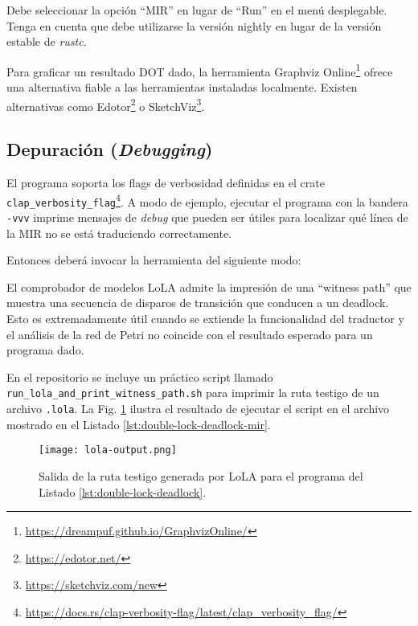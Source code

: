 Debe seleccionar la opción ``MIR'' en lugar de ``Run'' en el menú desplegable.
Tenga en cuenta que debe utilizarse la versión nightly en lugar de la versión estable de \emph{rustc}.

Para graficar un resultado DOT dado,
la herramienta Graphviz Online\footnote{\url{https://dreampuf.github.io/GraphvizOnline/}}
ofrece una alternativa fiable a las herramientas instaladas localmente.
Existen alternativas como Edotor\footnote{\url{https://edotor.net/}}
o SketchViz\footnote{\url{https://sketchviz.com/new}}.

\subsection{Depuración (\textit{Debugging})}
\label{sec:debugging}

El programa soporta los flags de verbosidad definidas en el crate
\texttt{clap\_verbosity\_flag}\footnote{\url{https://docs.rs/clap-verbosity-flag/latest/clap\_verbosity\_flag/}}.
A modo de ejemplo, ejecutar el programa con la bandera \texttt{-vvv} imprime mensajes de \emph{debug} que
pueden ser útiles para localizar qué línea de la \acrshort{MIR} no se está traduciendo correctamente.

Entonces deberá invocar la herramienta del siguiente modo:


El comprobador de modelos \acrshort{LoLA} admite la impresión de una ``witness path''
que muestra una secuencia de disparos de transición que conducen a un deadlock.
Esto es extremadamente útil cuando se extiende la funcionalidad del traductor y
el análisis de la red de Petri no coincide con el resultado esperado para un programa dado.

En el repositorio se incluye un práctico script llamado \texttt{run\_lola\_and\_print\_witness\_path.sh}
para imprimir la ruta testigo de un archivo \texttt{.lola}.
La Fig. \ref{fig:lola-output} ilustra el resultado
de ejecutar el script en el archivo mostrado en el Listado \ref{lst:double-lock-deadlock-mir}.

\begin{figure}[!htb]
  \centering
  \texttt{[image: lola-output.png]}
  \caption{Salida de la ruta testigo generada por LoLA para el programa del Listado \ref{lst:double-lock-deadlock}.}
  \label{fig:lola-output}
\end{figure}